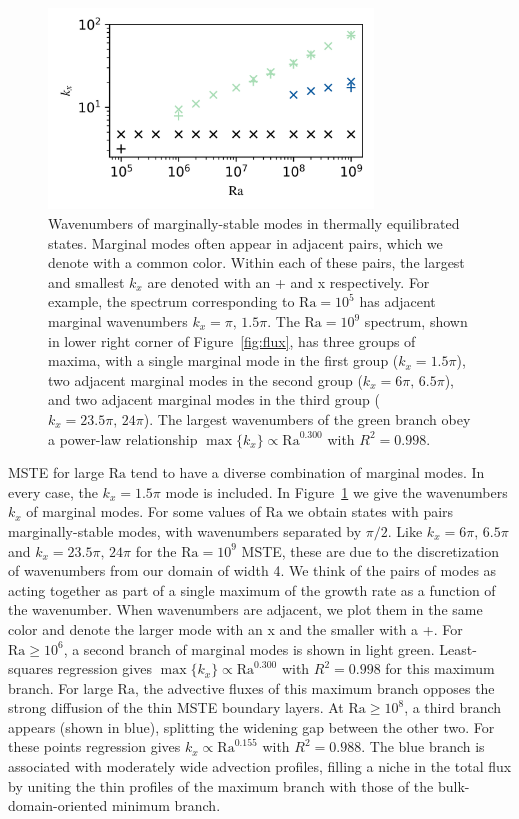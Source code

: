 \documentclass[reprint,amsmath,amssymb,aps]{revtex4-1}
\newcommand\Ra{\mathrm{Ra}}
\begin{document}
\begin{figure}
    \centering
    \includegraphics[width=3.4in]{kx_m_ra1.png}
    \caption{Wavenumbers of marginally-stable modes in thermally equilibrated states. 
    Marginal modes often appear in adjacent pairs, which we denote with a common color. 
    Within each of these pairs, the largest and smallest $k_x$ are denoted with an + and x respectively.
    For example, the spectrum corresponding to $\Ra = 10^5$ has adjacent marginal wavenumbers $k_x = \pi, \, 1.5\pi$. 
    The $\Ra = 10^9$ spectrum, shown in lower right corner of Figure~\ref{fig:flux}, has three groups of maxima, with a single marginal mode in the first group ($k_x = 1.5\pi$), two adjacent marginal modes in the second group ($k_x = 6\pi, \, 6.5\pi$), and two adjacent marginal modes in the third group ($k_x = 23.5\pi, \, 24\pi$). 
    The largest wavenumbers of the green branch obey a power-law relationship $\max\{k_x\} \propto \Ra^{0.300}$ with $R^2 = 0.998$.}
    \label{fig:kx_marginals}
\end{figure}

MSTE for large $\Ra$ tend to have a diverse combination of marginal modes.
In every case, the $k_x = 1.5\pi$ mode is included. 
In Figure~\ref{fig:kx_marginals} we give the wavenumbers $k_x$ of marginal modes. 
For some values of $\Ra$ we obtain states with pairs marginally-stable modes, with wavenumbers separated by $\pi/2$.
Like $k_x = 6\pi, \, 6.5\pi$ and $k_x=23.5\pi, \, 24\pi$ for the $\Ra=10^9$ MSTE, these are due to the discretization of wavenumbers from our domain of width 4.
We think of the pairs of modes as acting together as part of a single maximum of the growth rate as a function of the wavenumber.
When wavenumbers are adjacent, we plot them in the same color and denote the larger mode with an x and the smaller with a +.
For $\Ra \geq 10^6$, a second branch of marginal modes is shown in light green. 
Least-squares regression gives $\max\{k_x\} \propto \Ra^{0.300}$ with $R^2 = 0.998$ for this maximum branch.
For large $\Ra$, the advective fluxes of this maximum branch opposes the strong diffusion of the thin MSTE boundary layers. 
At $\Ra \geq 10^8$, a third branch appears (shown in blue), splitting the widening gap between the other two. 
For these points regression gives $k_x \propto \Ra^{0.155}$ with $R^2 = 0.988$.
The blue branch is associated with moderately wide advection profiles, filling a niche in the total flux by uniting the thin profiles of the maximum branch with those of the bulk-domain-oriented minimum branch.
\end{document}
